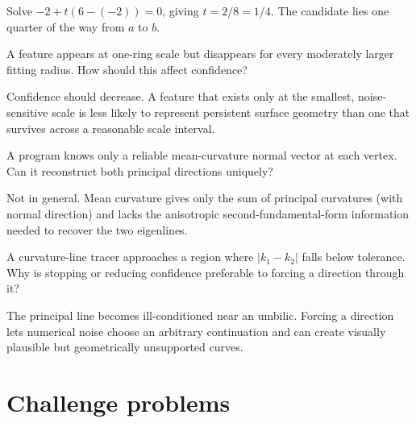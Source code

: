 \begin{solution}
Solve \(-2+t(6-(-2))=0\), giving \(t=2/8=1/4\).  The candidate lies one quarter of the way from \(a\) to \(b\).
\end{solution}

\begin{problem}\label{prob:vii42-10}
A feature appears at one-ring scale but disappears for every moderately larger fitting radius.  How should this affect confidence?
\end{problem}

\begin{solution}
Confidence should decrease.  A feature that exists only at the smallest, noise-sensitive scale is less likely to represent persistent surface geometry than one that survives across a reasonable scale interval.
\end{solution}

\begin{problem}\label{prob:vii42-11}
A program knows only a reliable mean-curvature normal vector at each vertex.  Can it reconstruct both principal directions uniquely?
\end{problem}

\begin{solution}
Not in general.  Mean curvature gives only the sum of principal curvatures (with normal direction) and lacks the anisotropic second-fundamental-form information needed to recover the two eigenlines.
\end{solution}

\begin{problem}\label{prob:vii42-12}
A curvature-line tracer approaches a region where \(|k_1-k_2|\) falls below tolerance.  Why is stopping or reducing confidence preferable to forcing a direction through it?
\end{problem}

\begin{solution}
The principal line becomes ill-conditioned near an umbilic.  Forcing a direction lets numerical noise choose an arbitrary continuation and can create visually plausible but geometrically unsupported curves.
\end{solution}


\section{Challenge problems}

